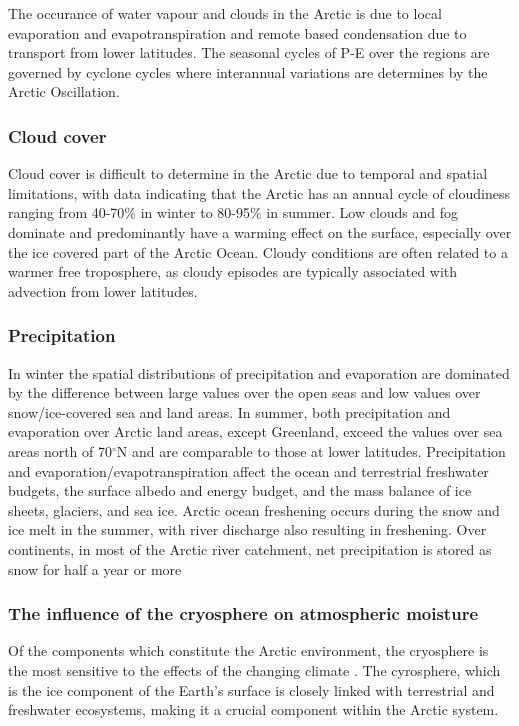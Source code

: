 \documentclass[12pt, oneside]{article}
\begin{document}
The occurance of water vapour and clouds in the Arctic is due to local evaporation and evapotranspiration and remote based condensation due to transport from lower latitudes. The seasonal cycles of P-E over the regions are governed by cyclone cycles where interannual variations are determines by the Arctic Oscillation. 


\subsubsection{Cloud cover}
Cloud cover is difficult to determine in the Arctic due to temporal and spatial limitations, with data indicating that the Arctic has an annual cycle of cloudiness ranging from 40-70\% in winter to 80-95\% in summer. Low clouds and fog dominate and predominantly have a warming effect on the surface, especially over the ice covered part of the Arctic Ocean. Cloudy conditions are often related to a warmer free troposphere, as cloudy episodes are typically associated with advection from lower latitudes. 


\subsubsection{Precipitation}
In winter the spatial distributions of precipitation and evaporation are dominated by the difference between large values over the open seas and low values over snow/ice-covered sea and land areas. In summer, both precipitation and evaporation over Arctic land areas, except Greenland, exceed the values over sea areas north of 70$^{\circ}$N and are comparable to those at lower latitudes. Precipitation and evaporation/evapotranspiration affect the ocean and terrestrial freshwater budgets, the surface albedo and energy budget, and the mass balance of ice sheets, glaciers, and sea ice. Arctic ocean freshening occurs during the snow and ice melt in the summer, with river discharge also resulting in freshening. Over continents, in most of the Arctic river catchment, net precipitation is stored as snow for half a year or more

\subsubsection{The influence of the cryosphere on atmospheric moisture}
Of the components which constitute the Arctic environment, the cryosphere is the most sensitive to the effects of the changing climate \cite{rinke2019trends}. The cyrosphere, which is the ice component of the Earth's surface is closely linked with terrestrial and freshwater ecosystems, making it a crucial component within the Arctic system.
\end{document}
